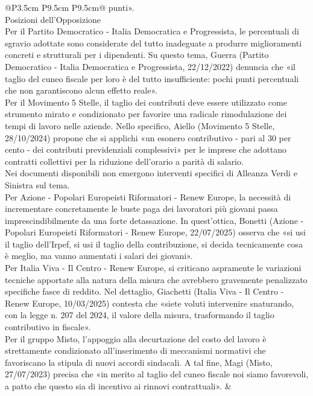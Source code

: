 \documentclass[a4paper,11pt]{article}
\begin{document}
\begin{landscape}
\begin{longtable}{@{}P{3.5cm} P{9.5cm} P{9.5cm}@{}}
punti».\\[6pt] Posizioni dell'Opposizione\\[6pt] Per il Partito Democratico - Italia Democratica e Progressista, le percentuali di sgravio adottate sono considerate del tutto inadeguate a produrre miglioramenti concreti e strutturali per i dipendenti. Su questo tema, Guerra (Partito Democratico - Italia Democratica e Progressista, 22/12/2022) denuncia che «il taglio del cuneo fiscale per loro è del tutto insufficiente: pochi punti percentuali che non garantiscono alcun effetto reale».\\[6pt] Per il Movimento 5 Stelle, il taglio dei contributi deve essere utilizzato come strumento mirato e condizionato per favorire una radicale rimodulazione dei tempi di lavoro nelle aziende. Nello specifico, Aiello (Movimento 5 Stelle, 28/10/2024) propone che si applichi «un esonero contributivo - pari al 30 per cento - dei contributi previdenziali complessivi» per le imprese che adottano contratti collettivi per la riduzione dell'orario a parità di salario.\\[6pt] Nei documenti disponibili non emergono interventi specifici di Alleanza Verdi e Sinistra sul tema.\\[6pt] Per Azione - Popolari Europeisti Riformatori - Renew Europe, la necessità di incrementare concretamente le buste paga dei lavoratori più giovani passa imprescindibilmente da una forte detassazione. In quest'ottica, Bonetti (Azione - Popolari Europeisti Riformatori - Renew Europe, 22/07/2025) osserva che «si usi il taglio dell'Irpef, si usi il taglio della contribuzione, si decida tecnicamente cosa è meglio, ma vanno aumentati i salari dei giovani».\\[6pt] Per Italia Viva - Il Centro - Renew Europe, si criticano aspramente le variazioni tecniche apportate alla natura della misura che avrebbero gravemente penalizzato specifiche fasce di reddito. Nel dettaglio, Giachetti (Italia Viva - Il Centro - Renew Europe, 10/03/2025) contesta che «siete voluti intervenire snaturando, con la legge n. 207 del 2024, il valore della misura, trasformando il taglio contributivo in fiscale».\\[6pt] Per il gruppo Misto, l'appoggio alla decurtazione del costo del lavoro è strettamente condizionato all'inserimento di meccanismi normativi che favoriscano la stipula di nuovi accordi sindacali. A tal fine, Magi (Misto, 27/07/2023) precisa che «in merito al taglio del cuneo fiscale noi siamo favorevoli, a patto che questo sia di incentivo ai rinnovi contrattuali». & \\

\end{longtable}
\end{landscape}
\end{document}
